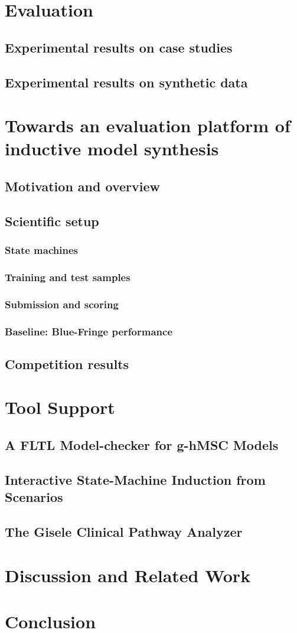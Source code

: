 \documentclass[dvips,a4paper,11pt]{report}
\begin{document}
\chapter{Evaluation}
  \section{Experimental results on case studies}
  \section{Experimental results on synthetic data}
\chapter{Towards an evaluation platform of inductive model synthesis\label{section_stamina}}
  \section{Motivation and overview\label{subsection_stamina_overview}}
  \section{Scientific setup\label{subsection_stamina_setup}}
    \subsection{State machines}
    \subsection{Training and test samples}
    \subsection{Submission and scoring}
    \subsection{Baseline: Blue-Fringe performance\label{subsection_stamina_baseline}}
  \section{Competition results\label{subsection_stamina_results}}
\chapter{Tool Support}
  \section{A FLTL Model-checker for g-hMSC Models}
  \section{Interactive State-Machine Induction from Scenarios}
  \section{The Gisele Clinical Pathway Analyzer}
\chapter{Discussion and Related Work}
\chapter{Conclusion}


\end{document}
